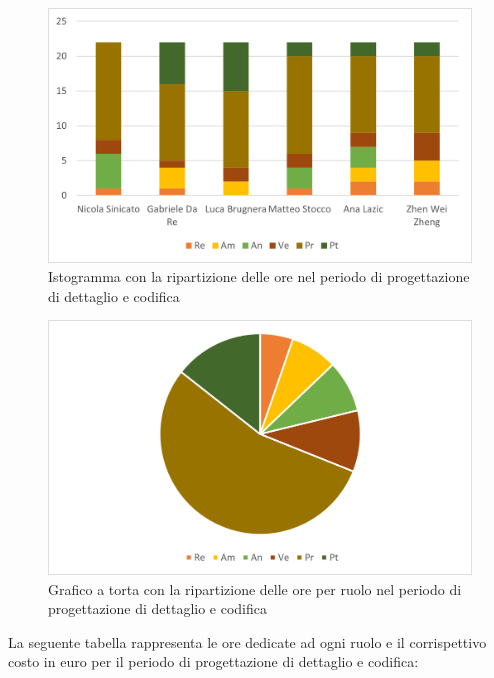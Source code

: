 \begin{figure}[H]
    \centering
    \includegraphics[scale=0.6]{img/grafi preventivo/istogrammi/codifica/complessivo.png}
    \caption{Istogramma con la ripartizione delle ore nel periodo di progettazione di dettaglio e codifica}
\end{figure}
\begin{figure}[H]
    \centering
    \includegraphics[scale=0.6]{img/grafi preventivo/torta/codifica/complessivo.png}
    \caption{Grafico a torta con la ripartizione delle ore per ruolo nel periodo di progettazione di dettaglio e codifica}
\end{figure}
La seguente tabella rappresenta le ore dedicate ad ogni ruolo e il corrispettivo costo in euro per il periodo di progettazione di dettaglio e codifica:

